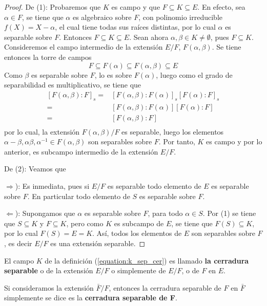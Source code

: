 \documentclass[12pt]{report}
\theoremstyle{largebreak}
\begin{document}
    \begin{proof}
        De (1): Probaremos que $K$ es campo y que $F\subseteq K\subseteq E$. En efecto, sea $\alpha\in F$, se tiene que $\alpha$ es algebraico sobre $F$, con polinomio irreducible $f(X)=X-\alpha$, el cual tiene todas sus raíces distintas, por lo cual $\alpha$ es separable sobre $F$. Entonces $F\subseteq K\subseteq E$.
        Sean ahora $\alpha,\beta\in K\neq\emptyset$, pues $F\subseteq K$. Consideremos el campo intermedio de la extensión $E/F$, $F(\alpha,\beta)$. Se tiene entonces la torre de campos
        \begin{equation*}
            F\subseteq F(\alpha)\subseteq F(\alpha, \beta)\subseteq E
        \end{equation*}
        Como $\beta$ es separable sobre $F$, lo es sobre $F(\alpha)$, luego como el grado de separabilidad es multiplicativo, se tiene que
        \begin{equation*}
            \begin{split}
                \left[F(\alpha,\beta):F\right]_s=&\left[F(\alpha,\beta):F(\alpha)\right]_s\left[F(\alpha):F\right]_s\\
                =&\left[F(\alpha,\beta):F(\alpha)\right]\left[F(\alpha):F\right]\\
                =&\left[F(\alpha,\beta):F\right]\\
            \end{split}
        \end{equation*}
        por lo cual, la extensión $F(\alpha,\beta)/F$ es separable, luego los elementos $\alpha-\beta, \alpha\beta, \alpha^{-1}\in F(\alpha,\beta)$ son separables sobre $F$. Por tanto, $K$ es campo y por lo anterior, es subcampo intermedio de la extensión $E/F$.
        
        De (2): Veamos que

        $\Rightarrow$): Es inmediata, pues si $E/F$ es separable todo elemento de $E$ es separable sobre $F$. En particular todo elemento de $S$ es separable sobre $F$.

        $\Leftarrow$): Supongamos que $\alpha$ es separable sobre $F$, para todo $\alpha\in S$. Por (1) se tiene que $S\subseteq K$ y $F\subseteq K$, pero como $K$ es subcampo de $E$, se tiene que $F(S)\subseteq K$, por lo cual $F(S)=E=K$. Así, todos los elementos de $E$ son separables sobre $F$, es decir $E/F$ es una extensión separable. 
    \end{proof}

    \begin{mydef}
        El campo $K$ de la definición (\ref{equation:k_sep_cer}) es llamado \textbf{la cerradura separable} o de la extensión $E/F$ o simplemente de $E/F$, o de $F$ en $E$.

        Si consideramos la extensión $\bar{F}/F$, entonces la cerradura separable de $F$ en $\bar{F}$ simplemente se dice es la \textbf{cerradura separable de F}.
    \end{mydef}
    
\end{document}
